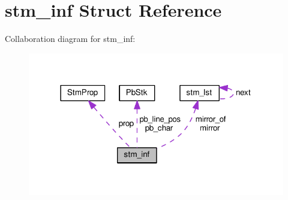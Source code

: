\hypertarget{structstm__inf}{}\section{stm\+\_\+inf Struct Reference}
\label{structstm__inf}


Collaboration diagram for stm\+\_\+inf\+:\nopagebreak
\begin{figure}[H]
\begin{center}
\leavevmode
\includegraphics[width=318pt]{structstm__inf__coll__graph}
\end{center}
\end{figure}
